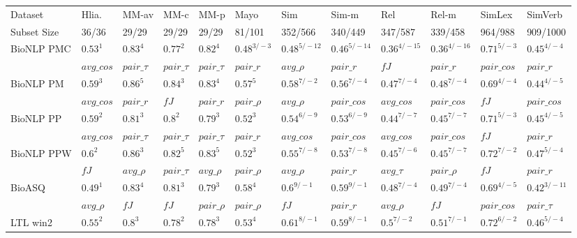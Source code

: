\documentclass[letterpaper]{article} %
\begin{document}
\begin{table}
    \centering
    \footnotesize
    \begin{adjustbox}{angle=90}
    \begin{tabular}{l l l l l l l l l l l l}
         Dataset & Hlia. & MM-av & MM-c & MM-p & Mayo & Sim & Sim-m & Rel & Rel-m & SimLex & SimVerb\\ 
Subset Size & 36/36 & 29/29 & 29/29 & 29/29 & 81/101 & 352/566 & 340/449 & 347/587 & 339/458 & 964/988 & 909/1000\\
\midrule
BioNLP PMC & $0.53^{1}$ & $0.83^{4}$ & $0.77^{2}$ & $0.82^{4}$ & $0.48^{3/-3}$ & $0.48^{5/-12}$ & $0.46^{5/-14}$ & $0.36^{4/-15}$ & $0.36^{4/-16}$ & $0.71^{5/-3}$ & $0.45^{4/-4}$ \\
 & $avg\_cos$ & $pair\_\tau$ & $pair\_\tau$ & $pair\_\tau$ & $pair\_r$ & $avg\_\rho$ & $pair\_r$ & $fJ$ & $pair\_r$ & $pair\_cos$ & $pair\_r$ \\
BioNLP PM & $0.59^{3}$ & $0.86^{5}$ & $0.84^{3}$ & $0.83^{4}$ & $0.57^{5}$ & $0.58^{7/-2}$ & $0.56^{7/-4}$ & $0.47^{7/-4}$ & $0.48^{7/-4}$ & $0.69^{4/-4}$ & $0.44^{4/-5}$ \\
 & $avg\_cos$ & $pair\_r$ & $fJ$ & $pair\_r$ & $pair\_\rho$ & $avg\_\rho$ & $pair\_cos$ & $avg\_cos$ & $pair\_cos$ & $fJ$ & $pair\_cos$ \\
BioNLP PP & $0.59^{2}$ & $0.81^{3}$ & $0.8^{2}$ & $0.79^{3}$ & $0.52^{3}$ & $0.54^{6/-9}$ & $0.53^{6/-9}$ & $0.44^{7/-7}$ & $0.45^{7/-7}$ & $0.71^{5/-3}$ & $0.45^{4/-5}$ \\
 & $avg\_cos$ & $pair\_\tau$ & $pair\_\tau$ & $pair\_\tau$ & $pair\_r$ & $avg\_cos$ & $pair\_cos$ & $avg\_cos$ & $pair\_cos$ & $fJ$ & $pair\_r$ \\
BioNLP PPW & $0.6^{2}$ & $0.86^{3}$ & $0.82^{5}$ & $0.83^{5}$ & $0.52^{3}$ & $0.55^{7/-8}$ & $0.53^{7/-8}$ & $0.45^{7/-6}$ & $0.45^{7/-7}$ & $0.72^{7/-2}$ & $0.47^{5/-4}$ \\
 & $fJ$ & $avg\_\rho$ & $pair\_\tau$ & $avg\_\rho$ & $pair\_\rho$ & $avg\_\rho$ & $pair\_r$ & $avg\_\tau$ & $pair\_\rho$ & $fJ$ & $pair\_r$ \\
BioASQ & $0.49^{1}$ & $0.83^{4}$ & $0.81^{3}$ & $0.79^{3}$ & $0.58^{4}$ & $0.6^{9/-1}$ & $0.59^{9/-1}$ & $0.48^{7/-4}$ & $0.49^{7/-4}$ & $0.69^{4/-5}$ & $0.42^{3/-11}$ \\
& $avg\_\rho$ & $fJ$ & $fJ$ & $pair\_\rho$ & $pair\_\rho$ & $fJ$ & $pair\_r$ & $avg\_\rho$ & $fJ$ & $pair\_cos$ & $pair\_\tau$ \\
LTL win2 & $0.55^{2}$ & $0.8^{3}$ & $0.78^{2}$ & $0.78^{3}$ & $0.53^{4}$ & $0.61^{8/-1}$ & $0.59^{8/-1}$ & $0.5^{7/-2}$ & $0.51^{7/-1}$ & $0.72^{6/-2}$ & $0.46^{5/-4}$ \\

\end{tabular}
\end{adjustbox}
\end{table}
\end{document}
